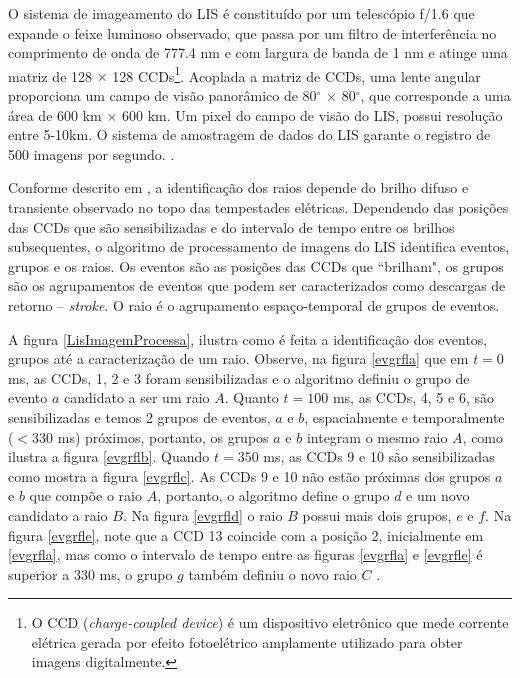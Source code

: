 O sistema de imageamento do LIS é constituído por um telescópio f/1.6 que expande o feixe luminoso observado, que passa por um filtro de interferência no comprimento de onda de 777.4 nm e com largura de banda de 1 nm e atinge uma matriz de 128 $\times$ 128 CCDs\footnote{O CCD (\textit{charge-coupled device}) é um dispositivo eletrônico que mede corrente elétrica gerada por efeito fotoelétrico amplamente utilizado para obter imagens digitalmente.}. Acoplada a matriz de CCDs, uma lente angular proporciona um campo de visão panorâmico de 80$^{\circ}$ $\times$ 80$^{\circ}$, que corresponde a uma área de 600 km $\times$ 600 km. Um pixel do campo de visão do LIS, possui resolução entre 5-10km. O sistema de amostragem de dados do LIS garante o registro de 500 imagens por segundo. \cite{christian2000LISalgorithm,boccippio1996science,trmmhandbook}. 



Conforme descrito em , a identificação dos raios depende do brilho difuso e transiente observado no topo das tempestades elétricas. Dependendo das posições das CCDs que são sensibilizadas e do intervalo de tempo entre os brilhos subsequentes, o algoritmo de processamento de imagens do LIS identifica  eventos, grupos e os raios. Os eventos são as posições das CCDs que ``brilham", os grupos são os agrupamentos de eventos que podem ser caracterizados como descargas de retorno -- \textit{stroke}. O raio é o agrupamento espaço-temporal de grupos de eventos.


A figura \ref{LisImagemProcessa}, ilustra como é feita a identificação dos  eventos, grupos até a caracterização de um raio. Observe, na figura \ref{evgrfla} que em $t=0$ ms, as CCDs, 1, 2 e 3  foram sensibilizadas e o algoritmo definiu o grupo de evento $a$ candidato a ser um raio $A$.  Quanto $t=100$ ms, as CCDs, 4, 5 e 6, são sensibilizadas e temos 2 grupos de eventos, $a$ e $b$, espacialmente e temporalmente ($<$330 ms) próximos, portanto, os grupos $a$ e $b$ integram o mesmo raio $A$, como ilustra a figura \ref{evgrflb}. Quando $t = 350$ ms, as CCDs 9 e 10 são sensibilizadas como mostra a figura \ref{evgrflc}. As CCDs 9 e 10 não estão próximas dos grupos $a$ e $b$ que compõe o raio $A$, portanto, o algoritmo define o grupo $d$ e um novo candidato a raio $B$. Na figura \ref{evgrfld} o raio $B$ possui mais dois grupos, $e$ e $f$. Na figura \ref{evgrfle}, note que a CCD 13 coincide com a posição 2, inicialmente em \ref{evgrfla}, mas como o intervalo de tempo entre as figuras \ref{evgrfla} e \ref{evgrfle} é superior a 330 ms, o grupo $g$ também definiu o novo raio $C$ \cite{christian2000LISalgorithm}.  

